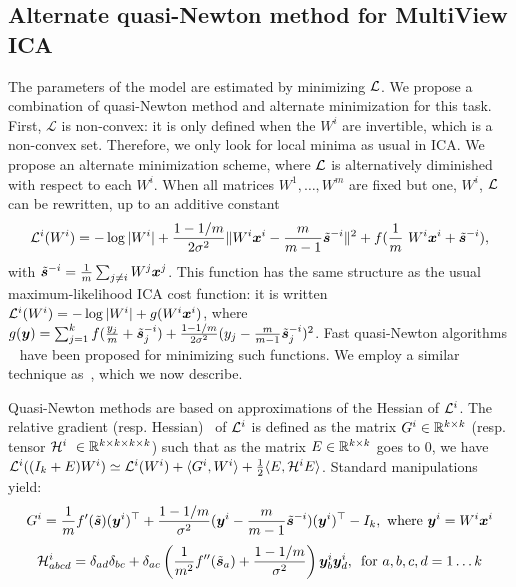 \subsection{Alternate quasi-Newton method for MultiView ICA}
%
The parameters of the model are estimated by minimizing $\mathcal{L}$.
%
We propose a combination of quasi-Newton method and alternate minimization for this task.
%
First, $\mathcal{L}$ is non-convex: it is only defined when the $W^i$ are invertible, which is a non-convex set.
%
Therefore, we only look for local minima as usual in ICA.
%
We propose an alternate minimization scheme, where $\mathcal{L}$ is alternatively diminished with respect to each $W^i$. 
%
When all matrices $W^1, \dots, W^m$ are fixed but one, $W^i$, $\mathcal{L}$ can be rewritten, up to an additive constant 
\begin{equation}
    \label{eq:indiv_loss}
    \loss^i(W^i) = -\log|W^i| + \frac{1 - 1/m}{2\sigma^2}\|W^i\xb^i - \frac{m}{m-1}\tilde{\sbb}^{-i}\|^2 + f(\frac1m W^i \xb^i +\tilde{\sbb}^{-i}), 
\end{equation}
with $\tilde{\boldsymbol{s}}^{-i} = \frac1m \sum_{j \neq i}W^j \boldsymbol{x}^j$.
%
This function has the same structure as the usual maximum-likelihood ICA cost function: it is written $\mathcal{L}^i(W^i) = -\log|W^i| + g(W^i\boldsymbol{x}^i)$, where $g(\boldsymbol{y}) = \sum_{j=1}^kf(\frac{y_j}{m} + \tilde{\boldsymbol{s}}^{-i}_j) + \frac{1 - 1/m}{2\sigma^2}(y_j - \frac{m}{m-1}\tilde{\boldsymbol{s}}^{-i}_j)^2$.
%
Fast quasi-Newton algorithms ~\cite{zibulevsky2003blind, ablin2018faster} have been proposed for minimizing such functions.
%
We employ a similar technique as~\cite{zibulevsky2003blind}, which we now describe.

Quasi-Newton methods are based on approximations of the Hessian of $\mathcal{L}^i$.
%
The relative gradient (resp. Hessian)~\cite{amari1996new, cardoso1996equivariant} of $\mathcal{L}^i$ is defined as the matrix $G^i\in \mathbb{R}^{k \times k}$ (resp. tensor $\mathcal{H}^i \in \bbR^{k\times k\times k\times k}$) such that as the matrix $E\in\mathbb{R}^{k\times k}$ goes to $0$, we have $\mathcal{L}^i((I_k + E)W^i) \simeq \mathcal{L}^i(W^i) + \langle G^i, W^i\rangle + \frac12\langle E, \mathcal{H}^iE\rangle$. Standard manipulations yield:
\begin{equation}
    \label{eq:gradient}
    G^i = \frac1mf'(\tilde{\boldsymbol{s}})(\boldsymbol{y}^i)^{\top} + \frac{1 - 1 /m}{\sigma^2}(\boldsymbol{y}^i - \frac{m}{m-1}\tilde{\boldsymbol{s}}^{-i})(\boldsymbol{y}^i)^{\top} - I_k, \text{ where } \boldsymbol{y}^i= W^i\boldsymbol{x}^i
\end{equation}
\begin{equation}
    \label{eq:hessian}
    \mathcal{H}^i_{abcd} = \delta_{ad}\delta_{bc} + \delta_{ac}\left(\frac{1}{m^2}f''(\tilde{\boldsymbol{s}}_a) + \frac{1 - 1/m}{\sigma^2}\right)\boldsymbol{y}^i_{b}\boldsymbol{y}^i_d,\enspace \text{for }a, b, c, d =1\dots k
\end{equation}


